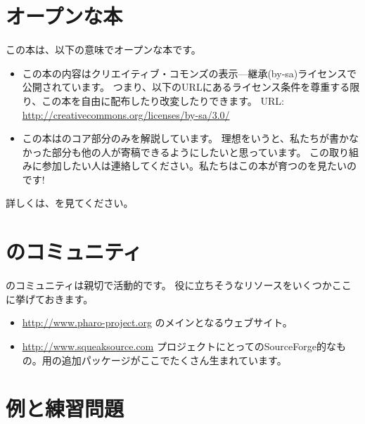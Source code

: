\documentclass[a4paper,10pt,twoside]{book}
\begin{document}
\section*{オープンな本}

この本は、以下の意味でオープンな本です。

\begin{itemize}


\item	この本の内容はクリエイティブ・コモンズの表示—継承(by-sa)ライセンスで公開されています。
		つまり、以下のURLにあるライセンス条件を尊重する限り、この本を自由に配布したり改変したりできます。
		URL: 
		\url{http://creativecommons.org/licenses/by-sa/3.0/}


\item	この本は\pharo のコア部分のみを解説しています。
		理想をいうと、私たちが書かなかった部分も他の人が寄稿できるようにしたいと思っています。
		この取り組みに参加したい人は連絡してください。私たちはこの本が育つのを見たいのです!
		
\end{itemize}


詳しくは、\pbe を見てください。


\section*{ \pharo のコミュニティ}


\pharo のコミュニティは親切で活動的です。
役に立ちそうなリソースをいくつかここに挙げておきます。

\begin{itemize}
\item \url{http://www.pharo-project.org} \pharo のメインとなるウェブサイト。


\item \url{http://www.squeaksource.com} \pharo プロジェクトにとってのSourceForge的なもの。\pharo 用の追加パッケージがここでたくさん生まれています。

\end{itemize}

\section*{例と練習問題}
\end{document}
